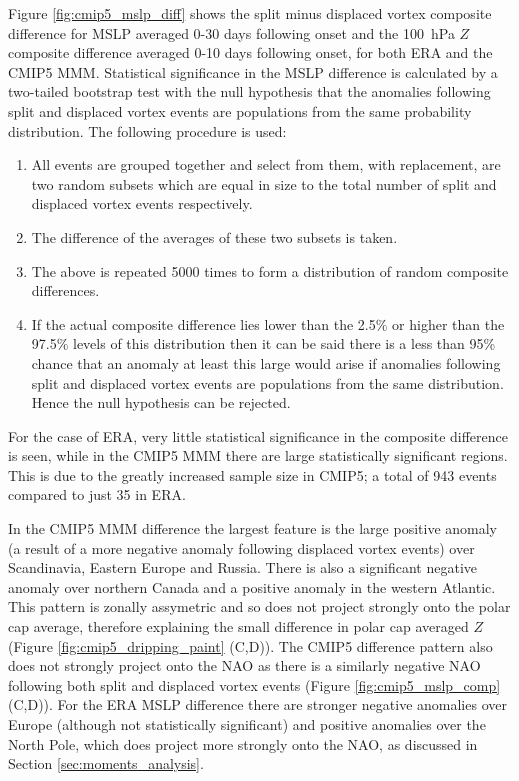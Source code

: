 \bigskip Figure \ref{fig:cmip5_mslp_diff} shows the split minus displaced vortex
composite difference for MSLP averaged 0-30 days following onset and the 100~hPa
$Z$ composite difference averaged 0-10 days following onset, for both ERA and
the CMIP5 MMM. Statistical significance in the MSLP difference is calculated by
a two-tailed bootstrap test with the null hypothesis that the anomalies
following split and displaced vortex events are populations from the same
probability distribution. The following procedure is used:
\begin{enumerate}
\item All events are grouped together and select from them, with replacement,
  are two random subsets which are equal in size to the total number of split
  and displaced vortex events respectively.
\item The difference of the averages of these two subsets is taken.
\item The above is repeated 5000 times to form a distribution of random
  composite differences.
\item If the actual composite difference lies lower than the 2.5\% or higher
  than the 97.5\% levels of this distribution then it can be said there is a
  less than 95\% chance that an anomaly at least this large would arise if
  anomalies following split and displaced vortex events are populations from the
  same distribution. Hence the null hypothesis can be rejected.
\end{enumerate}
For the case of ERA, very little statistical significance in the
composite difference is seen, while in the CMIP5 MMM there are large
statistically significant regions. This is due to the greatly increased sample
size in CMIP5; a total of 943 events compared to just 35 in ERA. 

In the CMIP5 MMM difference the largest feature is the large positive anomaly (a
result of a more negative anomaly following displaced vortex events) over
Scandinavia, Eastern Europe and Russia. There is also a significant negative
anomaly over northern Canada and a positive anomaly in the western
Atlantic. This pattern is zonally assymetric and so does not project strongly
onto the polar cap average, therefore explaining the small difference in polar
cap averaged $Z$ (Figure \ref{fig:cmip5_dripping_paint} (C,D)). The CMIP5
difference pattern also does not strongly project onto the NAO as there is a
similarly negative NAO following both split and displaced vortex events (Figure
\ref{fig:cmip5_mslp_comp} (C,D)). For the ERA MSLP difference there are stronger
negative anomalies over Europe (although not statistically significant) and
positive anomalies over the North Pole, which does project more strongly onto
the NAO, as discussed in Section \ref{sec:moments_analysis}. 

